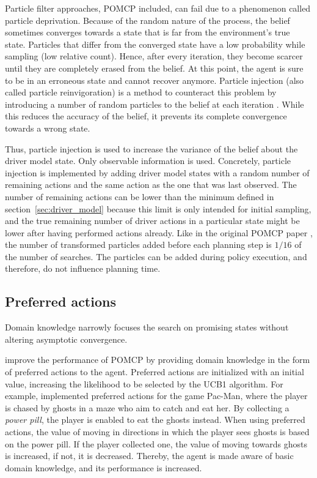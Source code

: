 Particle filter approaches, POMCP included, can fail due to a phenomenon called particle deprivation. Because of the random nature of the process, the belief sometimes converges towards a state that is far from the environment's true state. Particles that differ from the converged state have a low probability while sampling (low relative count). Hence, after every iteration, they become scarcer until they are completely erased from the belief. At this point, the agent is sure to be in an erroneous state and cannot recover anymore. Particle injection (also called particle reinvigoration) is a method to counteract this problem by introducing a number of random particles to the belief at each iteration \parencite{decision_making_book}. While this reduces the accuracy of the belief, it prevents its complete convergence towards a wrong state. 

Thus, particle injection is used to increase the variance of the belief about the driver model state. Only observable information is used. Concretely, particle injection is implemented by adding driver model states with a random number of remaining actions and the same action as the one that was last observed. The number of remaining actions can be lower than the minimum defined in section~\ref{sec:driver_model} because this limit is only intended for initial sampling, and the true remaining number of driver actions in a particular state might be lower after having performed actions already. Like in the original POMCP paper \parencite{pomcp}, the number of transformed particles added before each planning step is $1/16$ of the number of searches. The particles can be added during policy execution, and therefore, do not influence planning time.


\subsection{Preferred actions}
\label{sec:preferred_actions}

Domain knowledge narrowly
focuses the search on promising states without altering asymptotic convergence.

\cite{pomcp} improve the performance of POMCP by providing domain knowledge in the form of preferred actions to the agent. Preferred actions are initialized with an initial value, increasing the likelihood to be selected by the UCB1 algorithm. For example, \cite{pomcp} implemented preferred actions for the game Pac-Man, where the player is chased by ghosts in a maze who aim to catch and eat her. By collecting a \emph{power pill}, the player is enabled to eat the ghosts instead. When using preferred actions, the value of moving in directions in which the player sees ghosts is based on the power pill. If the player collected one, the value of moving towards ghosts is increased, if not, it is decreased. Thereby, the agent is made aware of basic domain knowledge, and its performance is increased.

